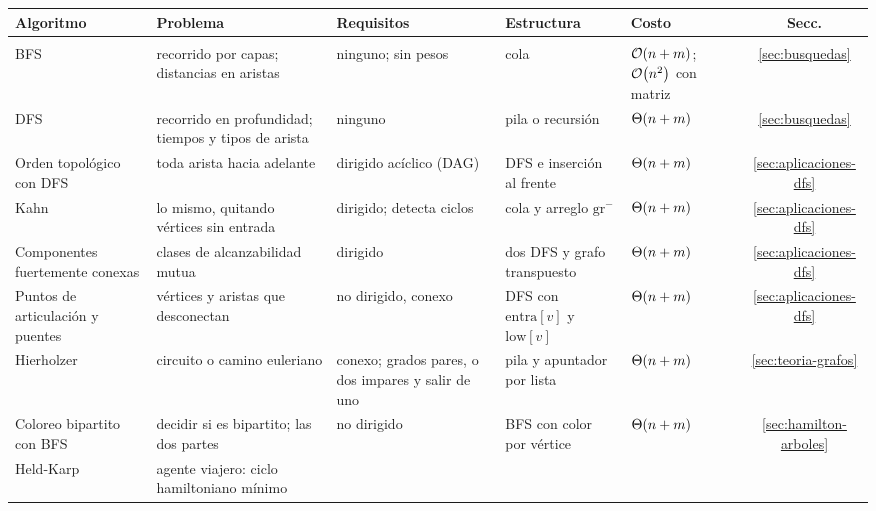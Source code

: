 \documentclass[11pt,letterpaper]{article}
\begin{document}
\begingroup
\small
\setlength{\tabcolsep}{4pt}
\begin{center}
\begin{tabular}{@{}>{\raggedright\arraybackslash}p{2.5cm}%
                >{\raggedright\arraybackslash}p{3.3cm}%
                >{\raggedright\arraybackslash}p{3.1cm}%
                >{\raggedright\arraybackslash}p{2.7cm}%
                >{\raggedright\arraybackslash}p{2.9cm}c@{}}
  \toprule
  \textbf{Algoritmo} & \textbf{Problema} & \textbf{Requisitos}
    & \textbf{Estructura} & \textbf{Costo} & \textbf{Secc.} \\
  \midrule
  \multicolumn{6}{@{}l}{\textit{Recorridos y estructura del grafo}} \\
  \addlinespace[2pt]
  BFS & recorrido por capas; distancias en aristas
      & ninguno; sin pesos
      & cola & $\mathcal{O}\!\left(n + m\right)$; $\mathcal{O}\!\left(n^2\right)$ con matriz
      & \ref{sec:busquedas} \\
  \addlinespace
  DFS & recorrido en profundidad; tiempos y tipos de arista
      & ninguno & pila o recursión & $\Theta\!\left(n + m\right)$
      & \ref{sec:busquedas} \\
  \addlinespace
  Orden topológico con DFS & toda arista hacia adelante
      & dirigido acíclico (DAG)
      & DFS e inserción al frente & $\Theta\!\left(n + m\right)$
      & \ref{sec:aplicaciones-dfs} \\
  \addlinespace
  Kahn & lo mismo, quitando vértices sin entrada
      & dirigido; detecta ciclos
      & cola y arreglo $\text{gr}^{-}$ & $\Theta\!\left(n + m\right)$
      & \ref{sec:aplicaciones-dfs} \\
  \addlinespace
  Componentes fuertemente conexas & clases de alcanzabilidad mutua
      & dirigido & dos DFS y grafo transpuesto & $\Theta\!\left(n + m\right)$
      & \ref{sec:aplicaciones-dfs} \\
  \addlinespace
  Puntos de articulación y puentes & vértices y aristas que
        desconectan
      & no dirigido, conexo
      & DFS con $\text{entra}[v]$ y $\text{low}[v]$ & $\Theta\!\left(n + m\right)$
      & \ref{sec:aplicaciones-dfs} \\
  \addlinespace
  Hierholzer & circuito o camino euleriano
      & conexo; grados pares, o dos impares y salir de uno
      & pila y apuntador por lista & $\Theta\!\left(n + m\right)$
      & \ref{sec:teoria-grafos} \\
  \addlinespace
  Coloreo bipartito con BFS & decidir si es bipartito; las dos partes
      & no dirigido & BFS con color por vértice & $\Theta\!\left(n + m\right)$
      & \ref{sec:hamilton-arboles} \\
  \addlinespace
  Held-Karp & agente viajero: ciclo hamiltoniano mínimo

\end{tabular}
\end{center}
\end{document}
